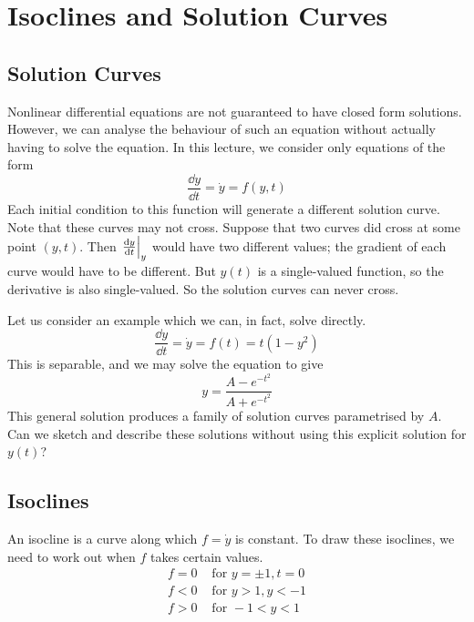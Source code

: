 \documentclass{article}
\begin{document}
\section{Isoclines and Solution Curves}
\subsection{Solution Curves}
Nonlinear differential equations are not guaranteed to have closed form solutions. However, we can analyse the behaviour of such an equation without actually having to solve the equation. In this lecture, we consider only equations of the form
\[ \frac{\dd{y}}{\dd{t}} = \dot y = f(y, t) \]
Each initial condition to this function will generate a different solution curve. Note that these curves may not cross. Suppose that two curves did cross at some point $(y, t)$. Then $\eval{\frac{\dd{y}}{\dd{t}}}_y$ would have two different values; the gradient of each curve would have to be different. But $y(t)$ is a single-valued function, so the derivative is also single-valued. So the solution curves can never cross.

Let us consider an example which we can, in fact, solve directly.
\[ \frac{\dd{y}}{\dd{t}} = \dot y = f(t) = t(1 - y^2) \]
This is separable, and we may solve the equation to give
\[ y = \frac{A - e^{-t^2}}{A + e^{-t^2}} \]
This general solution produces a family of solution curves parametrised by $A$. Can we sketch and describe these solutions without using this explicit solution for $y(t)$?

\subsection{Isoclines}
An isocline is a curve along which $f = \dot y$ is constant. To draw these isoclines, we need to work out when $f$ takes certain values.
\begin{align*}
	f = 0 & \text{ for } y = \pm 1, t = 0 \\
	f < 0 & \text{ for } y > 1, y < -1    \\
	f > 0 & \text{ for } -1 < y < 1
\end{align*}
\end{document}
